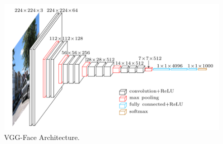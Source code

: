 \begin{figure}[H]	\includegraphics[width=0.8\linewidth]{images/vggarchitecture.png} 
\centering

\caption{VGG-Face Architecture.} 

\label{fig:vggarchitecture}
\end{figure}